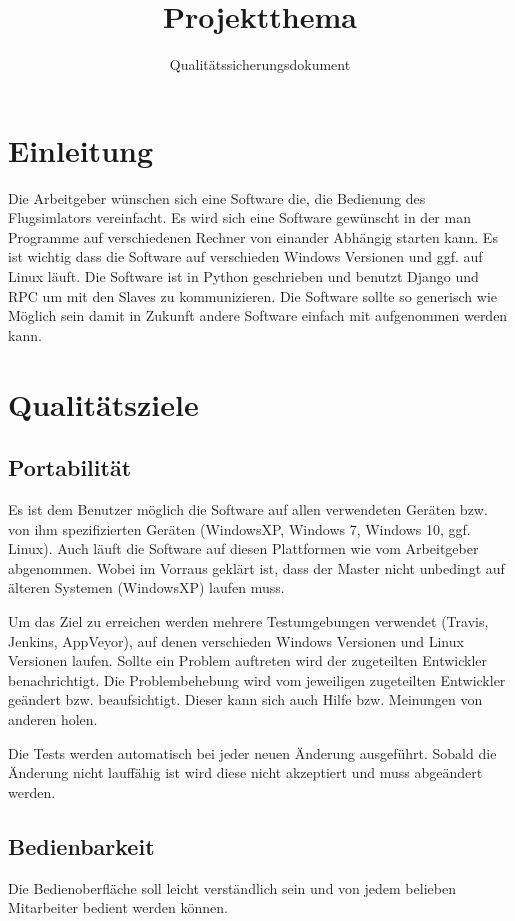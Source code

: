 \documentclass[accentcolor=tud9c,12pt,paper=a4]{tudreport}
\title{Projektthema}
\subtitle{Qualitätssicherungsdokument}
\begin{document}
	\maketitle
	\tableofcontents

	\chapter{Einleitung}
		Die Arbeitgeber wünschen sich eine Software die, die Bedienung des
		Flugsimlators vereinfacht. Es wird sich eine Software gewünscht
		in der man Programme auf verschiedenen Rechner von einander Abhängig
		starten kann. Es ist wichtig dass die Software auf verschieden
		Windows Versionen und ggf. auf Linux läuft. Die Software ist in Python
		geschrieben und benutzt Django und RPC um mit den Slaves zu
		kommunizieren. Die Software sollte so generisch wie Möglich sein
		damit in Zukunft andere Software einfach mit aufgenommen werden kann.

	\chapter{Qualitätsziele}
		\section{Portabilität}
			Es ist dem Benutzer möglich die Software auf allen verwendeten
			Geräten bzw. von ihm spezifizierten Geräten (WindowsXP, Windows 7,
			Windows 10, ggf. Linux). Auch läuft die Software auf diesen
			Plattformen wie vom Arbeitgeber abgenommen. Wobei im Vorraus
			geklärt ist, dass der Master nicht unbedingt auf älteren Systemen
			(WindowsXP) laufen muss.

			Um das Ziel zu erreichen werden mehrere Testumgebungen verwendet
			(Travis, Jenkins, AppVeyor), auf denen verschieden Windows
			Versionen und Linux Versionen laufen. Sollte ein Problem auftreten
			wird der zugeteilten Entwickler benachrichtigt. Die Problembehebung
			wird vom jeweiligen zugeteilten Entwickler geändert bzw.
			beaufsichtigt. Dieser kann sich auch Hilfe bzw. Meinungen von
			anderen holen.

			Die Tests werden automatisch bei jeder neuen Änderung ausgeführt.
			Sobald die Änderung nicht lauffähig ist wird diese nicht akzeptiert
			und muss abgeändert werden.
		\section{Bedienbarkeit}
			Die Bedienoberfläche soll leicht verständlich sein und von jedem
			belieben Mitarbeiter bedient werden können.
\end{document}
